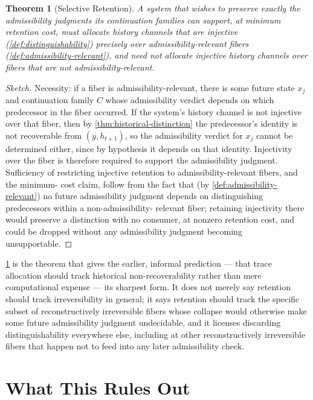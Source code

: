 \documentclass[11pt]{book}
\theoremstyle{plain}
\newtheorem{theorem}{Theorem}[chapter]
\theoremstyle{definition}
\theoremstyle{remark}
\begin{document}
\begin{theorem}[Selective Retention]
\label{thm:selective-retention}
A system that wishes to preserve exactly the admissibility judgments
its continuation families can support, at minimum retention cost, must
allocate history channels that are injective
(\cref{def:distinguishability}) precisely over admissibility-relevant
fibers (\cref{def:admissibility-relevant}), and need not allocate
injective history channels over fibers that are not
admissibility-relevant.
\end{theorem}

\begin{proof}[Sketch]
Necessity: if a fiber is admissibility-relevant, there is some future
state $x_j$ and continuation family $C$ whose admissibility verdict
depends on which predecessor in the fiber occurred. If the system's
history channel is not injective over that fiber, then by
\cref{thm:historical-distinction} the predecessor's identity is not
recoverable from $(y, h_{t+1})$, so the admissibility verdict for
$x_j$ cannot be determined either, since by hypothesis it depends on
that identity. Injectivity over the fiber is therefore required to
support the admissibility judgment. Sufficiency of restricting
injective retention to admissibility-relevant fibers, and the minimum-
cost claim, follow from the fact that (by
\cref{def:admissibility-relevant}) no future admissibility judgment
depends on distinguishing predecessors within a non-admissibility-
relevant fiber; retaining injectivity there would preserve a
distinction with no consumer, at nonzero retention cost, and could be
dropped without any admissibility judgment becoming unsupportable.
\end{proof}

\cref{thm:selective-retention} is the theorem that gives the earlier,
informal prediction --- that trace allocation should track historical
non-recoverability rather than mere computational expense --- its
sharpest form. It does not merely say retention should track
irreversibility in general; it says retention should track the
specific subset of reconstructively irreversible fibers whose collapse
would otherwise make some future admissibility judgment
undecidable, and it licenses discarding distinguishability everywhere
else, including at other reconstructively irreversible fibers that
happen not to feed into any later admissibility check.

\section{What This Rules Out}
\end{document}
